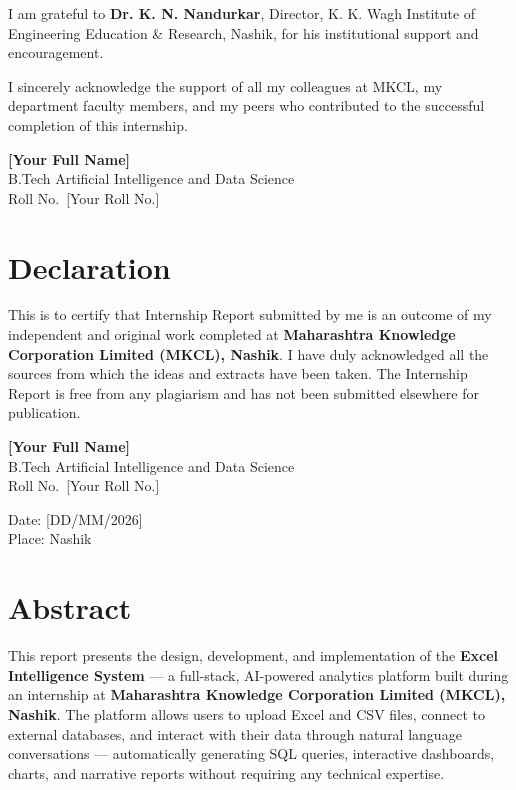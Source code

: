 \documentclass[12pt,a4paper]{report}
\begin{document}
I am grateful to \textbf{Dr. K. N. Nandurkar}, Director, K. K. Wagh Institute of Engineering Education \& Research, Nashik, for his institutional support and encouragement.

I sincerely acknowledge the support of all my colleagues at MKCL, my department faculty members, and my peers who contributed to the successful completion of this internship.

\vspace{2cm}
\begin{flushright}
\textbf{[Your Full Name]}\\
B.Tech Artificial Intelligence and Data Science\\
Roll No.\ [Your Roll No.]
\end{flushright}

\newpage
\chapter*{Declaration}

This is to certify that Internship Report submitted by me is an outcome of my independent and original work completed at \textbf{Maharashtra Knowledge Corporation Limited (MKCL), Nashik}. I have duly acknowledged all the sources from which the ideas and extracts have been taken. The Internship Report is free from any plagiarism and has not been submitted elsewhere for publication.

\vspace{2cm}
\begin{flushright}
\textbf{[Your Full Name]}\\
B.Tech Artificial Intelligence and Data Science\\
Roll No.\ [Your Roll No.]
\end{flushright}

\vspace{1cm}
\noindent Date: [DD/MM/2026]\\
Place: Nashik

\newpage
\chapter*{Abstract}

This report presents the design, development, and implementation of the \textbf{Excel Intelligence System} --- a full-stack, AI-powered analytics platform built during an internship at \textbf{Maharashtra Knowledge Corporation Limited (MKCL), Nashik}. The platform allows users to upload Excel and CSV files, connect to external databases, and interact with their data through natural language conversations --- automatically generating SQL queries, interactive dashboards, charts, and narrative reports without requiring any technical expertise.
\end{document}

